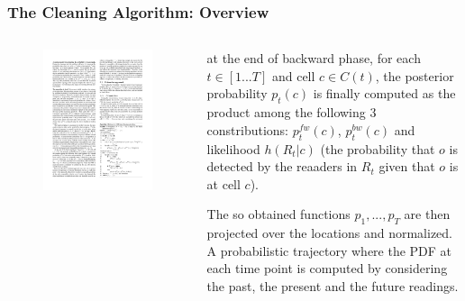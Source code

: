 
\begin{frame}
\frametitle{The Cleaning Algorithm: Overview}

\begin{columns}

  \begin{figure}[tb]
    \includegraphics[width=\columnwidth]{figures/3-4/3-4-16.pdf}
  \end{figure}

  \begin{sitemize}
    \item at the end of backward phase, for each $t \in [1...T]$ and cell $c \in C(t)$, the posterior probability $p_t(c)$ is finally computed as the product among the following 3 constributions: $p^{fw}_t(c)$, $p^{bw}_t(c)$ and likelihood $h(R_t|c)$ (the probability that $o$ is detected by the reaaders in $R_t$ given that $o$ is at cell $c$).
    \item The so obtained functions $p_1, ..., p_T$ are then projected over the locations and normalized. A probabilistic trajectory where the PDF at each time point is computed by considering the past, the present and the future readings.
  \end{sitemize}

\end{columns}

\end{frame}


